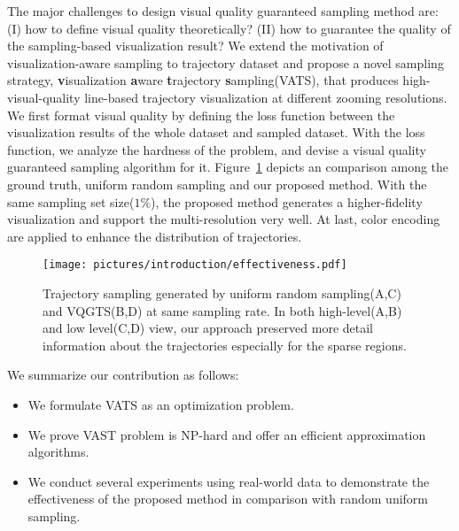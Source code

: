 The major challenges to design visual quality guaranteed sampling method are:
(I) how to define visual quality theoretically? (II) how to guarantee the quality of the sampling-based visualization result?
We extend the motivation of visualization-aware sampling to trajectory dataset and propose a novel sampling strategy, \textbf{v}isualization \textbf{a}ware \textbf{t}rajectory \textbf{s}ampling(VATS), that produces high-visual-quality line-based trajectory visualization at different zooming resolutions. 
We first format visual quality by defining the loss function between the visualization results of the whole dataset and sampled dataset.
With the loss function, we analyze the hardness of the problem, and devise a visual quality guaranteed sampling algorithm for it.
Figure~\ref{fig:compare} depicts an comparison among the ground truth,  uniform random sampling and our proposed method. With the same sampling set size($1\%$), the proposed method generates a higher-fidelity visualization and support the multi-resolution very well.   
At last, color encoding are applied to enhance the distribution of trajectories. 

\begin{figure}[t]
	\centering
	\texttt{[image: pictures/introduction/effectiveness.pdf]}
	\vspace{-5mm}
	\caption{Trajectory sampling generated by uniform random sampling(A,C) and VQGTS(B,D) at same sampling rate. In both high-level(A,B) and low level(C,D) view, our approach preserved more detail information about the trajectories especially for the sparse regions.}
	\vspace{-5mm}
	\label{fig:compare}
\end{figure}

We summarize our contribution as follows:
\begin{itemize}[noitemsep]
  \item We formulate VATS as an optimization problem.
  \item We prove VAST problem is NP-hard and offer an efficient approximation algorithms. 
  \item We conduct several experiments using real-world data to demonstrate the effectiveness of the proposed method in comparison with random uniform sampling.
\end{itemize}


